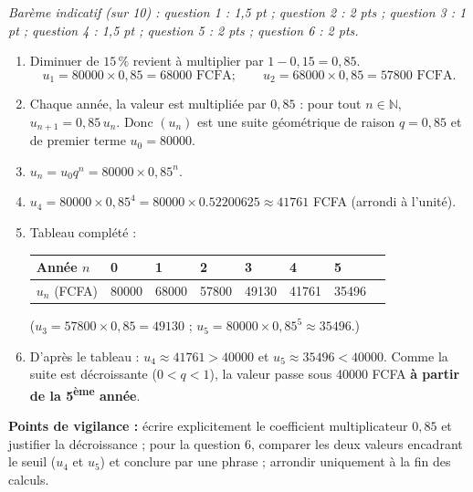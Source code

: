 \documentclass[11pt]{article}
\begin{document}
\begin{corrige}
\emph{Barème indicatif (sur 10) : question 1 : 1,5 pt ; question 2 : 2 pts ; question 3 : 1 pt ; question 4 : 1,5 pt ; question 5 : 2 pts ; question 6 : 2 pts.}
\begin{enumerate}
\item Diminuer de $15\,\%$ revient à multiplier par $1 - 0,15 = 0,85$.
\[ u_1 = \num{80000}\times 0,85 = \num{68000} \text{ FCFA} ; \qquad u_2 = \num{68000}\times 0,85 = \num{57800} \text{ FCFA}. \]
\item Chaque année, la valeur est multipliée par $0,85$ : pour tout $n \in \mathbb{N}$, $u_{n+1} = 0,85\,u_n$. Donc $(u_n)$ est une suite géométrique de raison $q = 0,85$ et de premier terme $u_0 = \num{80000}$.
\item $u_n = u_0 q^n = \num{80000}\times 0,85^n$.
\item $u_4 = \num{80000}\times 0,85^4 = \num{80000}\times \num{0,52200625} \approx \num{41761}$ FCFA (arrondi à l'unité).
\item Tableau complété :
\begin{center}
\begin{tabularx}{\linewidth}{|l|X|X|X|X|X|X|X|}\hline
Année $n$ & 0 & 1 & 2 & 3 & 4 & 5 \\ \hline
$u_n$ (FCFA) & \num{80000} & \num{68000} & \num{57800} & \num{49130} & \num{41761} & \num{35496} \\ \hline
\end{tabularx}
\end{center}
($u_3 = \num{57800}\times 0,85 = \num{49130}$ ; $u_5 = \num{80000}\times 0,85^5 \approx \num{35496}$.)
\item D'après le tableau : $u_4 \approx \num{41761} > \num{40000}$ et $u_5 \approx \num{35496} < \num{40000}$. Comme la suite est décroissante ($0 < q < 1$), la valeur passe sous \num{40000} FCFA \textbf{à partir de la 5\textsuperscript{ème} année}.
\end{enumerate}
\textbf{Points de vigilance :} écrire explicitement le coefficient multiplicateur $0,85$ et justifier la décroissance ; pour la question 6, comparer les deux valeurs encadrant le seuil ($u_4$ et $u_5$) et conclure par une phrase ; arrondir uniquement à la fin des calculs.
\end{corrige}
\end{document}
